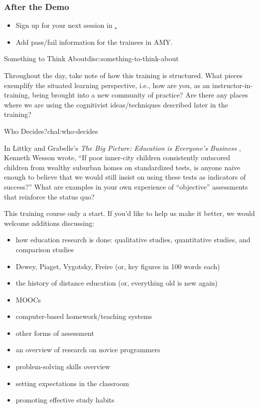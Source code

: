 \subsubsection{After the Demo}\label{after-the-demo}

\begin{itemize}
\item
  Sign up for your next session in
  \href{http://pad.software-carpentry.org/teaching-demos}.
\item
  Add pass/fail information for the trainees in AMY.
\end{itemize}


\begin{discussion}{Something to Think About}{disc:something-to-think-about}

Throughout the day, take note of how this training is structured. What
pieces exemplify the situated learning perspective, i.e., how are you,
as an instructor-in-training, being brought into a new community of
practice? Are there any places where we are using the cognitivist
ideas/techniques described later in the training?
\end{discussion}

\begin{challenge}{Who Decides?}{chal:who-decides}

In Littky and Grabelle's
\emph{The Big Picture: Education is Everyone's Business} \cite{bib:littky-big-picture},
Kenneth Wesson wrote,
``If poor inner-city children consistently outscored children from
wealthy suburban homes on standardized tests, is anyone naive enough to
believe that we would still insist on using these tests as indicators of
success?'' What are examples in your own experience of ``objective''
assessments that reinforce the status quo?
\end{challenge}


This training course only a start. If you'd like to help us make it
better, we would welcome additions discussing:

\begin{itemize}
\item
  how education research is done: qualitative studies, quantitative
  studies, and comparison studies
\item
  Dewey, Piaget, Vygotsky, Freire (or, key figures in 100 words each)
\item
  the history of distance education (or, everything old is new again)
\item
  MOOCs
\item
  computer-based homework/teaching systems
\item
  other forms of assessment
\item
  an overview of research on novice programmers
\item
  problem-solving skills overview
\item
  setting expectations in the classroom
\item
  promoting effective study habits
\end{itemize}


